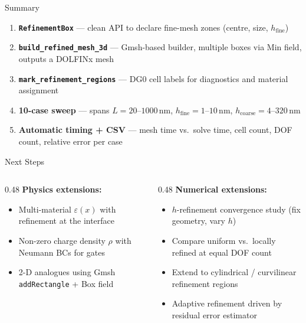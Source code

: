 \documentclass[aspectratio=169]{beamer}
\begin{document}
\begin{frame}{Summary}
  \begin{enumerate}
    \setlength\itemsep{0.5em}
    \item \textbf{\texttt{RefinementBox}} — clean API to declare fine-mesh zones
          (centre, size, $h_\text{fine}$)
    \item \textbf{\texttt{build\_refined\_mesh\_3d}} — Gmsh-based builder, multiple
          boxes via Min field, outputs a DOLFINx mesh
    \item \textbf{\texttt{mark\_refinement\_regions}} — DG0 cell labels for
          diagnostics and material assignment
    \item \textbf{10-case sweep} — spans $L = 20$--$1000$\,nm,
          $h_\text{fine} = 1$--$10$\,nm, $h_\text{coarse} = 4$--$320$\,nm
    \item \textbf{Automatic timing + CSV} — mesh time vs.\ solve time,
          cell count, DOF count, relative error per case
  \end{enumerate}
\end{frame}

\begin{frame}{Next Steps}
  \begin{columns}
    \begin{column}{0.48\textwidth}
      \textbf{Physics extensions:}
      \begin{itemize}
        \item Multi-material $\varepsilon(x)$ with refinement at the interface
        \item Non-zero charge density $\rho$ with Neumann BCs for gates
        \item 2-D analogues using Gmsh \texttt{addRectangle} + Box field
      \end{itemize}
    \end{column}
    \begin{column}{0.48\textwidth}
      \textbf{Numerical extensions:}
      \begin{itemize}
        \item $h$-refinement convergence study (fix geometry, vary $h$)
        \item Compare uniform vs.\ locally refined at equal DOF count
        \item Extend to cylindrical / curvilinear refinement regions
        \item Adaptive refinement driven by residual error estimator
      \end{itemize}
    \end{column}
  \end{columns}
\end{frame}
\end{document}
